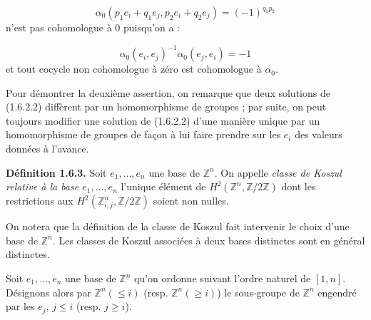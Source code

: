 \begin{equation*}
  \alpha_0(p_1e_i+q_1e_j,p_2e_i+q_2e_j)=(-1)^{q_1p_2}
\end{equation*}
n'est pas cohomologue à $0$ puisqu'on a :

\begin{equation*}
  \alpha_0(e_i,e_j)^{-1}\alpha_0(e_j,e_i)=-1
\end{equation*}
et tout cocycle non cohomologue à zéro est cohomologue à $\alpha_0$.

Pour démontrer la deuxième assertion, on remarque que deux solutions de
(1.6.2.2) diffèrent par un homomorphisme de groupes ; par suite, on peut
toujours modifier une solution de (1.6.2.2) d'une manière unique par un
homomorphisme de groupes de façon à lui faire prendre sur les $e_i$ des
valeurs données à l'avance.

\noindent\textbf{Définition 1.6.3.}\quad
Soit $e_1,\ldots,e_n$ une base de $\mathbb Z^n$. On appelle
\emph{classe de Koszul relative à la base $e_1,\ldots,e_n$} l'unique
élément de $H^2(\mathbb Z^n,\mathbb Z/2\mathbb Z)$ dont les restrictions
aux $H^2(\mathbb Z^n_{i,j},\mathbb Z/2\mathbb Z)$ soient non nulles.

On notera que la définition de la classe de Koszul fait intervenir le
choix d'une base de $\mathbb Z^n$. Les classes de Koszul associées à deux
bases distinctes sont en général distinctes.

Soit $e_1,\ldots,e_n$ une base de $\mathbb Z^n$ qu'on ordonne suivant
l'ordre naturel de $[1,n]$. Désignons alors par $\mathbb Z^n(\leq i)$
(resp. $\mathbb Z^n(\geq i)$) le sous-groupe de $\mathbb Z^n$ engendré
par les $e_j$, $j\leq i$ (resp. $j\geq i$).
